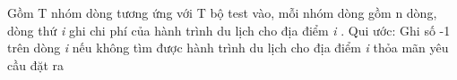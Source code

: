 Gồm T nhóm dòng tương ứng với T bộ test vào, mỗi nhóm dòng gồm n dòng, dòng thứ \emph{ i } ghi chi phí của hành trình du lịch cho địa điểm \emph{ i } . Qui ước: Ghi số -1 trên dòng \emph{ i } nếu không tìm được hành trình du lịch cho địa điểm \emph{ i } thỏa mãn yêu cầu đặt ra

\